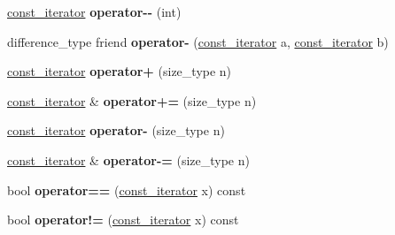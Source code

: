 \begin{DoxyCompactItemize}
\item 
\mbox{\label{classprevector_1_1const__iterator_a37d0e4597843c23ba8e31e5526851728}} 
\mbox{\hyperlink{classprevector_1_1const__iterator}{const\+\_\+iterator}} {\bfseries operator-\/-\/} (int)
\item 
\mbox{\label{classprevector_1_1const__iterator_a73e83a22f94bc5b9c48f25ef0bd27ce3}} 
difference\+\_\+type friend {\bfseries operator-\/} (\mbox{\hyperlink{classprevector_1_1const__iterator}{const\+\_\+iterator}} a, \mbox{\hyperlink{classprevector_1_1const__iterator}{const\+\_\+iterator}} b)
\item 
\mbox{\label{classprevector_1_1const__iterator_a807200cb187f66698d62f6514e1511e4}} 
\mbox{\hyperlink{classprevector_1_1const__iterator}{const\+\_\+iterator}} {\bfseries operator+} (size\+\_\+type n)
\item 
\mbox{\label{classprevector_1_1const__iterator_aca88910a8198d46d24bea84d39a6f07f}} 
\mbox{\hyperlink{classprevector_1_1const__iterator}{const\+\_\+iterator}} \& {\bfseries operator+=} (size\+\_\+type n)
\item 
\mbox{\label{classprevector_1_1const__iterator_ab053b2e3b60b800249ae81c0e3cb6583}} 
\mbox{\hyperlink{classprevector_1_1const__iterator}{const\+\_\+iterator}} {\bfseries operator-\/} (size\+\_\+type n)
\item 
\mbox{\label{classprevector_1_1const__iterator_a81c8256a4d09d3e7577a76906428ce3c}} 
\mbox{\hyperlink{classprevector_1_1const__iterator}{const\+\_\+iterator}} \& {\bfseries operator-\/=} (size\+\_\+type n)
\item 
\mbox{\label{classprevector_1_1const__iterator_a01bdd619167613fae83f13ab6c414b7c}} 
bool {\bfseries operator==} (\mbox{\hyperlink{classprevector_1_1const__iterator}{const\+\_\+iterator}} x) const
\item 
\mbox{\label{classprevector_1_1const__iterator_a7a7ecd92dd3a235299d794f41dcdbfb3}} 
bool {\bfseries operator!=} (\mbox{\hyperlink{classprevector_1_1const__iterator}{const\+\_\+iterator}} x) const

\end{DoxyCompactItemize}
